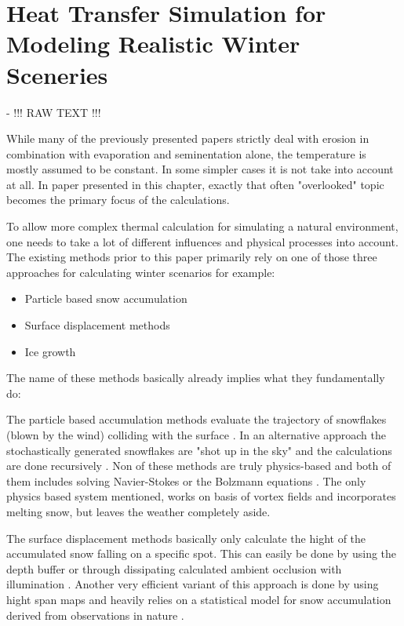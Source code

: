 \section{Heat Transfer Simulation for Modeling Realistic Winter Sceneries}

\cite{benes2001layered} - !!! RAW TEXT !!!


While many of the previously presented papers strictly deal with erosion in combination with evaporation and seminentation alone, the temperature is mostly assumed to be constant. In some simpler cases it is not take into account at all. In paper presented in this chapter, exactly that often "overlooked" topic becomes the primary focus of the calculations.

To allow more complex thermal calculation for simulating a natural environment, one needs to take a lot of different influences and physical processes into account. The existing methods prior to this paper primarily rely on one of those three approaches for calculating winter scenarios for example:
\begin{itemize}
	\item Particle based snow accumulation
	\item Surface displacement methods
	\item Ice growth
\end{itemize}

The name of these methods basically already implies what they fundamentally do:

The particle based accumulation methods evaluate the trajectory of snowflakes (blown by the wind) colliding with the surface \cite{nishita1997modeling}. In an alternative approach the stochastically generated snowflakes are "shot up in the sky" and the calculations are done recursively \cite{fearing2000computer}. Non of these methods are truly physics-based and both of them includes solving Navier-Stokes \cite{feldman2002modeling} or the Bolzmann equations \cite{wang2006real}. The only physics based system mentioned, works on basis of vortex fields and incorporates melting snow, but leaves the weather completely aside.

The surface displacement methods basically only calculate the hight of the accumulated snow falling on a specific spot. This can easily be done by using the depth buffer \cite{ohlsson2004real} or through dissipating calculated ambient occlusion with illumination \cite{foldes2007occlusion}. Another very efficient variant of this approach is done by using hight span maps and heavily relies on a statistical model for snow accumulation derived from observations in nature \cite{haglund2002snow} \cite{festenberg2009geometric}.

